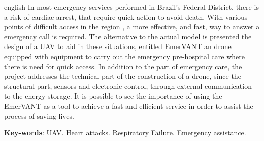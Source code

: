 \begin{resumo}[Abstract]
 \begin{otherlanguage*}{english}
In most emergency services performed in Brazil's Federal District, there is a risk of cardiac arrest, that require quick action to avoid death. With various points of difficult access in the region , a more effective, and fast, way to answer a emergency call is required. The alternative to the actual model is presented the design of a UAV to aid in these situations, entitled EmerVANT an drone equipped with equipment to carry out the emergency pre-hospital care where there is need for quick access. In addition to the part of emergency care, the project addresses the technical part of the construction of a drone, since the structural part, sensors and electronic control, through external communication to the energy storage. It is possible to see the importance of using the EmerVANT as a tool to achieve a fast and efficient service in order to assist the process of saving lives.

   \vspace{\onelineskip}
 
   \noindent 
   \textbf{Key-words}: UAV. Heart attacks. Respiratory Failure. Emergency assistance.
 \end{otherlanguage*}
\end{resumo}
